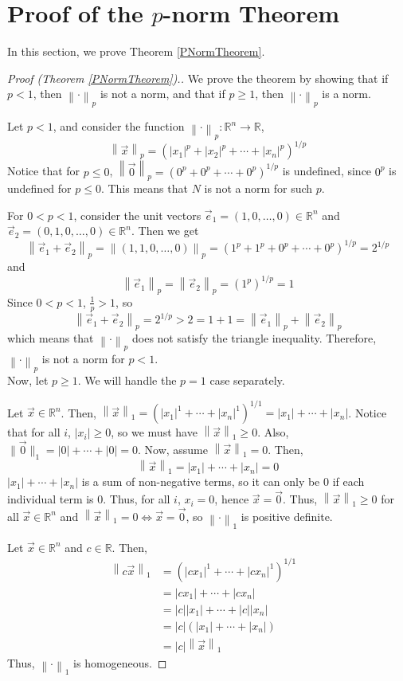 \documentclass{article}
\newcommand{\R}{\mathbb{R}}
\newcommand{\norm}[1]{\left\|#1\right\|}
\theoremstyle{plain} %
\numberwithin{thm}{section} %
\theoremstyle{definition} %
\begin{document}
\section{Proof of the $p$-norm Theorem}\label{PNormSection}

In this section, we prove Theorem \ref{PNormTheorem}.

\begin{proof}[Proof (Theorem \ref{PNormTheorem}).]
We prove the theorem by showing that if $p < 1$, then $\norm{\cdot}_p$ is not a norm, and that if $p \geq 1$, then $\norm{\cdot}_p$ is a norm.

Let $p < 1$, and consider the function $\norm{\cdot}_p: \R^n \to \R$, 
\[
\norm{\vec{x}}_p = \left(|x_1|^p + |x_2|^p + \cdots + |x_n|^p\right)^{1/p}
\]
Notice that for $p \leq 0$, $\norm{\vec{0}}_p = \left(0^p + 0^p + \cdots + 0^p\right)^{1/p}$ is undefined, since $0^p$ is undefined for $p \leq 0$. This means that $N$ is not a norm for such $p$.

For $0 < p < 1$, consider the unit vectors $\vec{e}_1 = (1, 0, \dots, 0) \in \R^n$ and $\vec{e}_2 = (0, 1, 0, \dots, 0) \in \R^n$. Then we get
\[
    \norm{\vec{e}_1 + \vec{e}_2}_p = \norm{(1, 1, 0, \dots, 0)}_p = (1^p + 1^p + 0^p + \cdots + 0^p)^{1/p} = 2^{1/p}
\]
and
\[
    \norm{\vec{e}_1}_p = \norm{\vec{e}_2}_p = (1^p)^{1/p} = 1
\]
Since $0 < p < 1$, $\frac{1}{p} > 1$, so 
\[
\norm{\vec{e}_1 + \vec{e}_2}_p = 2^{1/p} > 2 = 1 + 1 = \norm{\vec{e}_1}_p + \norm{\vec{e}_2}_p
\]
which means that $\norm{\cdot}_p$ does not satisfy the triangle inequality. Therefore, $\norm{\cdot}_p$ is not a norm for $p < 1$.\\

Now, let $p \geq 1$. We will handle the $p = 1$ case separately.

 Let $\vec{x} \in \R^n$. Then, $\norm{\vec{x}}_1 = (|x_1|^1 + \cdots + |x_n|^1)^{1/1} = |x_1| + \cdots + |x_n|$. Notice that for all $i$, $|x_i| \geq 0$, so we must have $\norm{\vec{x}}_1 \geq 0$. Also, $\|\vec{0}\|_1 = |0| + \cdots + |0| = 0$. Now, assume $\norm{\vec{x}}_1 = 0$. Then, 
\[
    \norm{\vec{x}}_1 = |x_1| + \cdots + |x_n| = 0
\]
$|x_1| + \cdots + |x_n|$ is a sum of non-negative terms, so it can only be $0$ if each individual term is 0. Thus, for all $i$, $x_i = 0$, hence $\vec{x} = \vec{0}$. Thus, $\norm{\vec{x}}_1 \geq 0$ for all $\vec{x} \in \R^n$ and $\norm{\vec{x}}_1 = 0 \iff \vec{x} = \vec{0}$, so $\norm{\cdot}_1$ is positive definite.

 Let $\vec{x} \in \R^n$ and $c \in \R$. Then,
\begin{align*}
    \norm{c\vec{x}}_1
    &= (|cx_1|^1 + \cdots + |cx_n|^1)^{1/1} &\\
    &= |cx_1| + \cdots + |cx_n| &\\
    &= |c||x_1| + \cdots + |c||x_n| &\\
    &= |c|(|x_1| + \cdots + |x_n|) &\\
    &= |c|\norm{\vec{x}}_1
\end{align*}
Thus, $\norm{\cdot}_1$ is homogeneous.


\end{proof}
\end{document}
